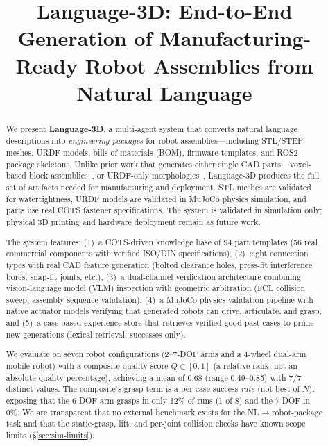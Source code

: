 \documentclass[conference]{IEEEtran}
\title{Language-3D: End-to-End Generation of Manufacturing-Ready Robot Assemblies from Natural Language}
\author{
\IEEEauthorblockN{Youcheng Xiong\textsuperscript{1,2}~and~Qianchen Xia\textsuperscript{1}$^{*}$}
\IEEEauthorblockA{\textsuperscript{1}Future Laboratory, Tsinghua University\\
Beijing, China\\
\textsuperscript{2}University of Macau\\
Macau SAR, China\\
$^{*}$Corresponding author: Qianchen Xia\\
\texttt{qianchenxia@tsinghua.edu.cn}\\
First author: \texttt{dc42857@um.edu.mo}
}
}
\begin{document}
\maketitle

\begin{abstract}
We present \textbf{Language-3D}, a multi-agent system that converts natural language descriptions into \emph{engineering packages} for robot assemblies---including STL/STEP meshes, URDF models, bills of materials (BOM), firmware templates, and ROS2 package skeletons. Unlike prior work that generates either single CAD parts~\cite{cadllama2025, stepllm2026}, voxel-based block assemblies~\cite{bloxnet2025}, or URDF-only morphologies~\cite{robomorph2024}, Language-3D produces the full set of artifacts needed for manufacturing and deployment. STL meshes are validated for watertightness, URDF models are validated in MuJoCo physics simulation, and parts use real COTS fastener specifications. The system is validated in simulation only; physical 3D printing and hardware deployment remain as future work.

The system features: (1)~a COTS-driven knowledge base of 94 part templates (56 real commercial components with verified ISO/DIN specifications), (2)~eight connection types with real CAD feature generation (bolted clearance holes, press-fit interference bores, snap-fit joints, etc.), (3)~a dual-channel verification architecture combining vision-language model (VLM) inspection with geometric arbitration (FCL collision sweep, assembly sequence validation), (4)~a MuJoCo physics validation pipeline with native actuator models verifying that generated robots can drive, articulate, and grasp, and (5)~a case-based experience store that retrieves verified-good past cases to prime new generations (lexical retrieval; successes only).

We evaluate on seven robot configurations (2--7-DOF arms and a 4-wheel dual-arm mobile robot) with a composite quality score $Q \in [0,1]$ (a relative rank, not an absolute quality percentage), achieving a mean of 0.68 (range 0.49--0.85) with 7/7 distinct values. The composite's grasp term is a per-case success \emph{rate} (not best-of-$N$), exposing that the 6-DOF arm grasps in only 12\% of runs (1 of 8) and the 7-DOF in 0\%. We are transparent that no external benchmark exists for the NL$\to$robot-package task and that the static-grasp, lift, and per-joint collision checks have known scope limits (\S\ref{sec:sim-limits}).
\end{abstract}
\end{document}
